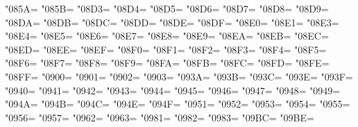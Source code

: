\XeTeXcharclass"085A=\KclassCM
\XeTeXcharclass"085B=\KclassCM
\XeTeXcharclass"08D3=\KclassCM
\XeTeXcharclass"08D4=\KclassCM
\XeTeXcharclass"08D5=\KclassCM
\XeTeXcharclass"08D6=\KclassCM
\XeTeXcharclass"08D7=\KclassCM
\XeTeXcharclass"08D8=\KclassCM
\XeTeXcharclass"08D9=\KclassCM
\XeTeXcharclass"08DA=\KclassCM
\XeTeXcharclass"08DB=\KclassCM
\XeTeXcharclass"08DC=\KclassCM
\XeTeXcharclass"08DD=\KclassCM
\XeTeXcharclass"08DE=\KclassCM
\XeTeXcharclass"08DF=\KclassCM
\XeTeXcharclass"08E0=\KclassCM
\XeTeXcharclass"08E1=\KclassCM
\XeTeXcharclass"08E3=\KclassCM
\XeTeXcharclass"08E4=\KclassCM
\XeTeXcharclass"08E5=\KclassCM
\XeTeXcharclass"08E6=\KclassCM
\XeTeXcharclass"08E7=\KclassCM
\XeTeXcharclass"08E8=\KclassCM
\XeTeXcharclass"08E9=\KclassCM
\XeTeXcharclass"08EA=\KclassCM
\XeTeXcharclass"08EB=\KclassCM
\XeTeXcharclass"08EC=\KclassCM
\XeTeXcharclass"08ED=\KclassCM
\XeTeXcharclass"08EE=\KclassCM
\XeTeXcharclass"08EF=\KclassCM
\XeTeXcharclass"08F0=\KclassCM
\XeTeXcharclass"08F1=\KclassCM
\XeTeXcharclass"08F2=\KclassCM
\XeTeXcharclass"08F3=\KclassCM
\XeTeXcharclass"08F4=\KclassCM
\XeTeXcharclass"08F5=\KclassCM
\XeTeXcharclass"08F6=\KclassCM
\XeTeXcharclass"08F7=\KclassCM
\XeTeXcharclass"08F8=\KclassCM
\XeTeXcharclass"08F9=\KclassCM
\XeTeXcharclass"08FA=\KclassCM
\XeTeXcharclass"08FB=\KclassCM
\XeTeXcharclass"08FC=\KclassCM
\XeTeXcharclass"08FD=\KclassCM
\XeTeXcharclass"08FE=\KclassCM
\XeTeXcharclass"08FF=\KclassCM
\XeTeXcharclass"0900=\KclassCM
\XeTeXcharclass"0901=\KclassCM
\XeTeXcharclass"0902=\KclassCM
\XeTeXcharclass"0903=\KclassCM
\XeTeXcharclass"093A=\KclassCM
\XeTeXcharclass"093B=\KclassCM
\XeTeXcharclass"093C=\KclassCM
\XeTeXcharclass"093E=\KclassCM
\XeTeXcharclass"093F=\KclassCM
\XeTeXcharclass"0940=\KclassCM
\XeTeXcharclass"0941=\KclassCM
\XeTeXcharclass"0942=\KclassCM
\XeTeXcharclass"0943=\KclassCM
\XeTeXcharclass"0944=\KclassCM
\XeTeXcharclass"0945=\KclassCM
\XeTeXcharclass"0946=\KclassCM
\XeTeXcharclass"0947=\KclassCM
\XeTeXcharclass"0948=\KclassCM
\XeTeXcharclass"0949=\KclassCM
\XeTeXcharclass"094A=\KclassCM
\XeTeXcharclass"094B=\KclassCM
\XeTeXcharclass"094C=\KclassCM
\XeTeXcharclass"094E=\KclassCM
\XeTeXcharclass"094F=\KclassCM
\XeTeXcharclass"0951=\KclassCM
\XeTeXcharclass"0952=\KclassCM
\XeTeXcharclass"0953=\KclassCM
\XeTeXcharclass"0954=\KclassCM
\XeTeXcharclass"0955=\KclassCM
\XeTeXcharclass"0956=\KclassCM
\XeTeXcharclass"0957=\KclassCM
\XeTeXcharclass"0962=\KclassCM
\XeTeXcharclass"0963=\KclassCM
\XeTeXcharclass"0981=\KclassCM
\XeTeXcharclass"0982=\KclassCM
\XeTeXcharclass"0983=\KclassCM
\XeTeXcharclass"09BC=\KclassCM
\XeTeXcharclass"09BE=\KclassCM
